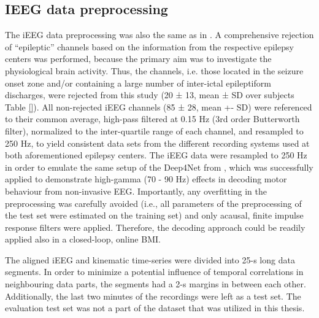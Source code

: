 \subsection{IEEG data preprocessing}\label{subsec:ieeg-data-preprocessing}
The iEEG data preprocessing was also the same as in \cite{hammer_2021}. A comprehensive rejection of “epileptic” channels based on the information from the respective epilepsy centers was performed, because the primary aim was to investigate the physiological brain activity. Thus, the channels, i.e. those located in the seizure onset zone and/or containing a large number of inter-ictal epileptiform discharges, were rejected from this study (20 ± 13, mean ± SD over subjects Table \ref{}). All non-rejected iEEG channels (85 ± 28, mean +- SD) were referenced to their common average, high-pass filtered at 0.15 Hz (3rd order Butterworth filter), normalized to the inter-quartile range of each channel, and resampled to 250 Hz, to yield consistent data sets from the different recording systems used at both aforementioned epilepsy centers. The iEEG data were resampled to 250 Hz in order to emulate the same setup of the Deep4Net from \cite{Schirrmeister_2017}, which was successfully applied to demonstrate high-gamma (70 - 90 Hz) effects in decoding motor behaviour from non-invasive EEG. Importantly, any overfitting in the preprocessing was carefully avoided (i.e., all parameters of the preprocessing of the test set were estimated on the training set) and only acausal, finite impulse response filters were applied. Therefore, the decoding approach could be readily applied also in a closed-loop, online BMI.

The aligned iEEG and kinematic time-series were divided into 25-s long data segments. In order to minimize a potential influence of temporal correlations in neighbouring data parts, the segments had a 2-s margins in between each other. Additionally, the last two minutes of the recordings were left as a test set. The evaluation test set was not a part of the dataset that was utilized in this thesis.

